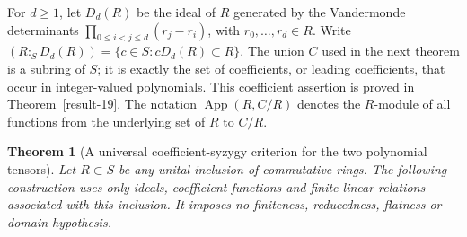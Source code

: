 \documentclass[11pt,a4paper]{article}
\newtheorem{theorem}{Theorem}[section]
\theoremstyle{definition}
\begin{document}
For $d\ge1$, let $D_d(R)$ be the ideal of $R$ generated by the
Vandermonde determinants $\prod_{0\le i<j\le d}(r_j-r_i)$, with
$r_0,\ldots,r_d\in R$. Write
$(R:_S D_d(R))=\{c\in S:cD_d(R)\subset R\}$.
The union $C$ used in the next theorem is a subring of $S$; it is
exactly the set of coefficients, or leading coefficients, that occur
in integer-valued polynomials. This coefficient assertion is proved in
Theorem~\ref{result-19}.
The notation $\operatorname{App}(R,C/R)$ denotes the $R$-module of all
functions from the underlying set of $R$ to $C/R$.
\begin{theorem}[A universal coefficient-syzygy criterion for the two polynomial tensors]\label{result-20}
Let $R\subset S$ be any unital inclusion of commutative rings. The
following construction uses only ideals, coefficient functions and
finite linear relations associated with this inclusion. It imposes
no finiteness, reducedness, flatness or domain hypothesis.


\end{theorem}
\end{document}
